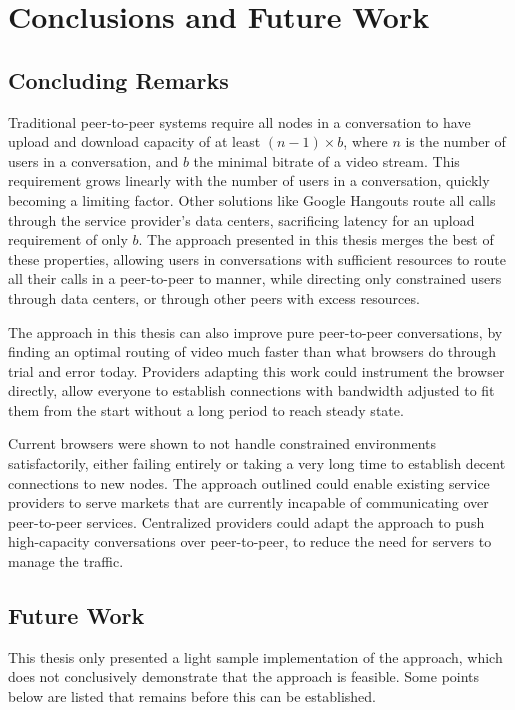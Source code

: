 \chapter{Conclusions and Future Work}\label{chp:conclusions}


\section{Concluding Remarks}\label{sec:conclusions}

Traditional peer-to-peer systems require all nodes in a conversation to have upload and download capacity of at least $(n-1) \times b$, where $n$ is the number of users in a conversation, and $b$ the minimal bitrate of a video stream. This requirement grows linearly with the number of users in a conversation, quickly becoming a limiting factor. Other solutions like Google Hangouts route all calls through the service provider's data centers, sacrificing latency for an upload requirement of only $b$. The approach presented in this thesis merges the best of these properties, allowing users in conversations with sufficient resources to route all their calls in a peer-to-peer to manner, while directing only constrained users through data centers, or through other peers with excess resources.

The approach in this thesis can also improve pure peer-to-peer conversations, by finding an optimal routing of video much faster than what browsers do through trial and error today. Providers adapting this work could instrument the browser directly, allow everyone to establish connections with bandwidth adjusted to fit them from the start without a long period to reach steady state.

Current browsers were shown to not handle constrained environments satisfactorily, either failing entirely or taking a very long time to establish decent connections to new nodes. The approach outlined could enable existing service providers to serve markets that are currently incapable of communicating over peer-to-peer services. Centralized providers could adapt the approach to push high-capacity conversations over peer-to-peer, to reduce the need for servers to manage the traffic.


\section{Future Work}\label{sec:future_work}

This thesis only presented a light sample implementation of the approach, which does not conclusively demonstrate that the approach is feasible. Some points below are listed that remains before this can be established.

